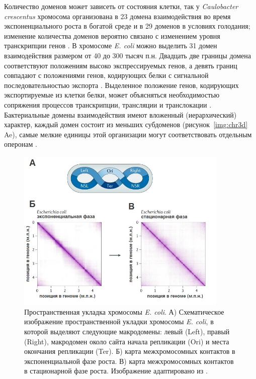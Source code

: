 Количество доменов может зависеть от состояния клетки, так у \textit{Caulobacter crescentus} хромосома организована в 23 домена взаимодействия во время экспоненциального роста в богатой среде и в 29 доменов в условиях голодания; изменение количества доменов вероятно связано с изменением уровня транскрипции генов \cite{dame2020chromosome}. В хромосоме \textit{E. coli} можно выделить 31 домен взаимодействия размером от 40 до 300 тысяч п.н. Двадцать две границы домена соответствуют положениям высоко экспрессируемых генов, а девять границ совпадают с положениями генов, кодирующих белки с сигнальной последовательностью экспорта \cite{lioy2018multiscale}. Выделенное положение генов, кодирующих экспортируемые из клетки белки, может объясняться необходимостью сопряжения процессов транскрипции, трансляции и транслокации \cite{woldringh2002role}. Бактериальные домены взаимодействия имеют вложенный (иерархический) характер, каждый домен состоит из меньших субдоменов (рисунок~\ref{img:chr3d} Ae), самые мелкие единицы этой организации могут соответствовать отдельным оперонам \cite{dame2020chromosome}.

\begin{figure}[!ht] 
  \center
  \includegraphics [width=0.9\textwidth] {Dissertation/images/lit/coli_3d.jpg}
  \caption{Пространственная укладка хромосомы \textit{E. coli}. А) Схематическое изображение пространственной укладки хромосомы \textit{E. coli}, в которой выделяют следующие макродомены: левый (Left), правый (Right), макродомен около сайта начала репликации (Ori) и места окончания репликации (Ter). Б) карта межхромосомных контактов в экспоненциальной фазе роста. В) карта межхромосомных контактов в стационарной фазе роста. Изображение адаптировано из \cite{dame2020chromosome}.} 
  \label{img:coli_3d}  
\end{figure}


